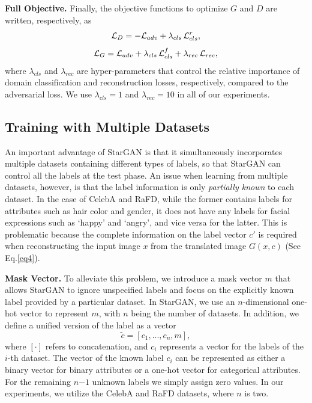 \documentclass[10pt,twocolumn,letterpaper]{article}
\begin{document}
\medskip

\noindent \textbf{Full Objective.} Finally, the objective functions to optimize $G$ and $D$ are written, respectively, as \begin{equation}
\mathcal{L}_{D} =  - \mathcal {L}_{adv} +  {\lambda}_{cls}\thinspace\mathcal{L}_{cls}^{r}, 
\end{equation}
\begin{equation}
\mathcal{L}_{G} =   \mathcal {L}_{adv} +  {\lambda}_{cls}\thinspace\mathcal{L}_{cls}^{f} + 
{\lambda}_{rec}\thinspace\mathcal{L}_{rec},
\end{equation}
where ${\lambda}_{cls}$ and ${\lambda}_{rec}$ are hyper-parameters that control the relative importance of domain classification and reconstruction losses, respectively, compared to the adversarial loss. We use ${\lambda}_{cls} = 1$ and ${\lambda}_{rec} = 10$ in all of our experiments. 

\medskip

\subsection{Training with Multiple Datasets} \label{section 3.2}
An important advantage of StarGAN is that it simultaneously incorporates multiple datasets containing different types of labels, so that StarGAN can control all the labels at the test phase. An issue when learning from multiple datasets, however, is that the label information is only \textit{partially known} to each dataset. In the case of CelebA\thinspace\cite{liu2015faceattributes} and RaFD\thinspace\cite{langner2010presentation}, while the former contains labels for attributes such as hair color and gender, it does not have any labels for facial expressions such as `happy' and `angry', and vice versa for the latter. This is problematic because the complete information on the label vector $c'$ is required when reconstructing the input image $x$ from the translated image $G(x, c)$ (See Eq.\thinspace\eqref{eq4}). 

\medskip

\noindent\textbf{Mask Vector.} To alleviate this problem, we introduce a mask vector $m$ that allows StarGAN to ignore unspecified labels and focus on the explicitly known label provided by a particular dataset. In StarGAN, we use an $n$-dimensional one-hot vector to represent $m$, with $n$ being the number of datasets. In addition, we define a unified version of the label as a vector
\begin{equation}
\tilde{c} = [{c}_{1}, ..., {c}_{n}, m],
\label{eq7}
\end{equation}
\noindent where $[\cdot]$ refers to concatenation, and ${c}_{i}$ represents a vector for the labels of the $i$-th dataset. The vector of the known label ${c}_{i}$ can be represented as either a binary vector for binary attributes or a one-hot vector for categorical attributes. For the remaining $n \mathbb{-} 1$ unknown labels we simply assign zero values. In our experiments, we utilize the CelebA and RaFD datasets, where $n$ is two. 
\end{document}

